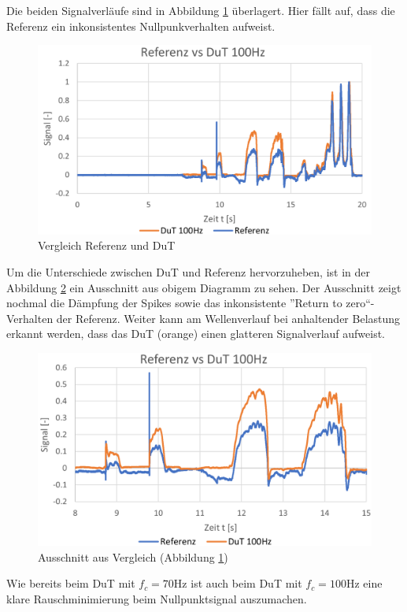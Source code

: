 \documentclass[12pt,a4paper]{article}
\begin{document}
\noindent Die beiden Signalverläufe sind in Abbildung \ref{fig:partcomp100hz} überlagert. Hier fällt auf, dass die Referenz ein inkonsistentes Nullpunkverhalten aufweist. 
	\begin{figure}[H]
		\centering
		\includegraphics[width=1\linewidth]{part_comp_100Hz}
		\caption{Vergleich Referenz und DuT}
		\label{fig:partcomp100hz}
	\end{figure}
\noindent Um die Unterschiede zwischen DuT und Referenz hervorzuheben, ist in der Abbildung \ref{fig:comp100hz} ein Ausschnitt aus obigem Diagramm zu sehen. Der Ausschnitt zeigt nochmal die Dämpfung der Spikes sowie das inkonsistente ''Return to zero``-Verhalten der Referenz. Weiter kann am Wellenverlauf bei anhaltender Belastung erkannt werden, dass das DuT (orange) einen glatteren Signalverlauf aufweist.
	\begin{figure}[H]
		\centering
		\includegraphics[width=1\linewidth]{comp_100Hz}
		\caption{Ausschnitt aus Vergleich (Abbildung \ref{fig:partcomp100hz})}
		\label{fig:comp100hz}
	\end{figure}
\noindent Wie bereits beim DuT mit $f_c=70$Hz ist auch beim DuT mit  $f_c=100$Hz eine klare Rauschminimierung beim Nullpunktsignal auszumachen.
\end{document}
